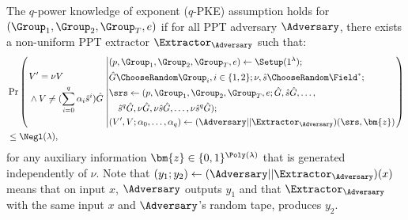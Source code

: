 \begin{assumption}
	The $q$-power knowledge of exponent ($q$-PKE) assumption holds for $(\Group_1, \Group_2, \Group_T, e)$ if for all PPT adversary $\Adversary$, there exists a non-uniform PPT extractor $\Extractor_{\Adversary}$ such that:
	\begin{align}
		& \Pr
		\left(
			\left.
			\begin{aligned}
				& V' = {\nu}V \\
				& \wedge V \ne (\sum_{i = 0}^{q} {\alpha}_i \hat{s}^i)\hat{G}\\ 
			\end{aligned}
			\right.
			\left|
			\begin{aligned}
				& (p, \Group_1, \Group_2, \Group_T, e) \leftarrow \Setup(1^{\lambda}); \\
				& \hat{G} \ChooseRandom \Group_i, i\in \{1, 2\}; \nu, \hat{s}\ChooseRandom \Field^*; \\
				& \srs \leftarrow (p, \Group_1, \Group_2, \Group_T, e; \hat{G}, \hat{s}\hat{G}, \ldots, \\
				& \quad \hat{s}^q \hat{G}, \nu \hat{G}, \nu \hat{s}\hat{G}, \ldots, \nu \hat{s}^q \hat{G});\\
				& (V', V; \alpha_0, \ldots, \alpha_q) \leftarrow (\Adversary|| \Extractor_{\Adversary})(\srs, \bm{z})
			\end{aligned}
			\right.
		\right)
		\nonumber \\ 
		& \le \Negl(\lambda),
		\nonumber
	\end{align}
for any auxiliary information $\bm{z} \in \{0, 1\}^{\Poly(\lambda)} $ that is generated independently of $\nu$.
Note that $(y_1; y_2) \gets (\Adversary|| \Extractor_{\Adversary})(x)$ means that on input $x$, $\Adversary$ outputs $y_1$ and
that $\Extractor_{\Adversary}$ with the same input $x$ and $\Adversary$'s random tape, produces $y_2$.
\end{assumption}

